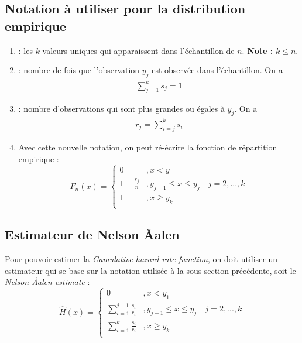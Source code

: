 \documentclass[12pt, french]{report}
\begin{document}
\subsection{Notation à utiliser pour la distribution empirique}
\begin{enumerate}[label=\faAngleRight]
\item {} : les $k$ valeurs uniques qui apparaissent dans l'échantillon de $n$. \textbf{Note : } $k \leq n$.

\item {} : nombre de fois que l'observation $y_j$ est observée dans l'échantillon. On a
\begin{align*}
\sum_{j=1}^{k} s_j = 1
\end{align*}

\item {} : nombre d'observations qui sont plus grandes ou égales à $y_j$. On a
\begin{align*}
r_j = \sum_{i=j}^{k} s_i
\end{align*}

\item Avec cette nouvelle notation, on peut ré-écrire la fonction de répartition empirique : 
\begin{equation}
F_n(x) = 
\begin{cases}
0						& , x < y \\
1 - \frac{r_j}{n}		& , y_{j-1} \leq x \leq y_j \quad j = 2, ..., k \\
1						& , x \geq y_k \\
\end{cases}
\end{equation}
\end{enumerate}

\subsection{Estimateur de Nelson \r{A}alen}
\label{subsec:nelson-Aalen}
Pour pouvoir estimer la \textit{Cumulative hazard-rate function}, on doit utiliser un estimateur qui se base sur la notation utilisée à la sous-section précédente, soit le \textit{Nelson \r{A}alen estimate} : 
\begin{equation}
\hat{H}(x) = 
\begin{cases}
0		& , x < y_1 \\
\sum_{i=1}^{j-1} \frac{s_i}{r_i}	& , y_{j-1} \leq x \leq y_j \quad j = 2, ..., k \\
\sum_{i=1}^{k} \frac{s_i}{r_i}		& , x \geq y_k \\
\end{cases}
\end{equation}
\end{document}
